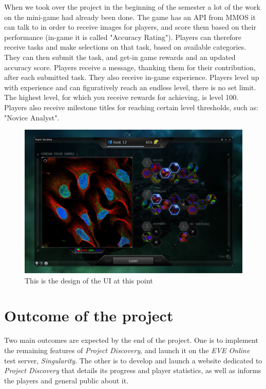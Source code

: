\documentclass[11pt]{article}
\begin{document}
When we took over the project in the beginning of the semester a lot of the work on the mini-game had already been done.
The game has an API from MMOS it can talk to in order to receive images for players, and score them based on their performance (in-game it is called "Accuracy Rating"). Players can therefore receive tasks and make selections on that task, based on available categories. They can then submit the task, and get-in game rewards and an updated accuracy score. Players receive a message, thanking them for their contribution, after each submitted task. They also receive in-game experience. Players level up with experience and can figuratively reach an endless level, there is no set limit. The highest level, for which you receive rewards for achieving, is level 100. Players also receive milestone titles for reaching certain level thresholds, such as: "Novice Analyst".

\begin{figure}[H]
	\centering
    \includegraphics[width=15cm]{PD.png}
    \caption{\label{fig:PD}This is the design of the UI at this point}
\end{figure}

\section*{Outcome of the project}

Two main outcomes are expected by the end of the project. One is to implement the remaining features of \emph{Project Discovery}, and launch it on the \emph{EVE Online} test server, \emph{Singularity}. The other is to develop and launch a website dedicated to \emph{Project Discovery} that details its progress and player statistics, as well as informs the players and general public about it.\\
\end{document}
